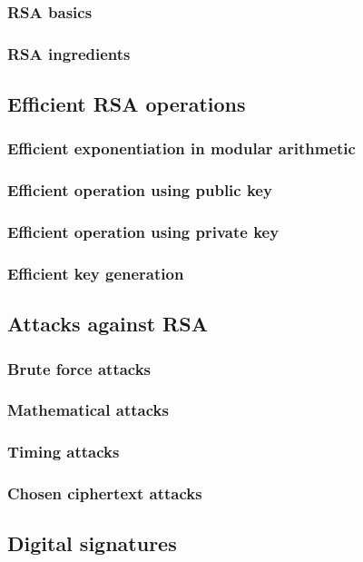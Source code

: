 \documentclass[12pt]{article}
\begin{document}
 \subsubsection{RSA basics}
 \subsubsection{RSA ingredients}
 
 \subsection{Efficient RSA operations}
 \subsubsection{Efficient exponentiation in modular arithmetic}
 \subsubsection{Efficient operation using public key}
 \subsubsection{Efficient operation using private key}
 \subsubsection{Efficient key generation}
 
 \subsection{Attacks against RSA}
 \subsubsection{Brute force attacks}
 \subsubsection{Mathematical attacks}
 \subsubsection{Timing attacks}
 \subsubsection{Chosen ciphertext attacks}
 
 \subsection{Digital signatures}
\end{document}
